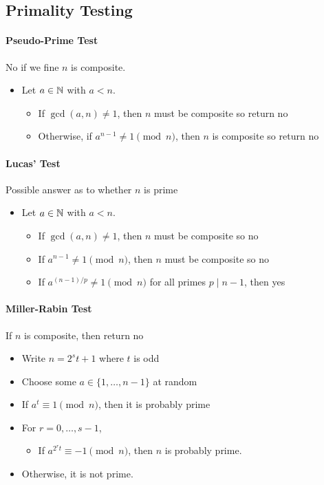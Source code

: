 \subsection{Primality Testing}
\paragraph{Pseudo-Prime Test}
No if we fine \(n\) is composite.
\begin{itemize}
    \item Let \(a \in \mathbb{N}\) with \(a < n\).
          \begin{itemize}
              \item If \(\gcd(a, n) \neq 1\), then \(n\) must be composite so return no
              \item Otherwise, if \(a^{n - 1} \neq 1 \pmod n\), then \(n\) is composite so return no
          \end{itemize}
\end{itemize}

\paragraph{Lucas' Test}
Possible answer as to whether \(n\) is prime
\begin{itemize}
    \item Let \(a \in \mathbb{N}\) with \(a < n\).
          \begin{itemize}
              \item If \(\gcd(a, n) \neq 1\), then \(n\) must be composite so no
              \item If \(a^{n - 1} \neq 1 \pmod n\), then \(n\) must be composite so no
              \item If \(a^{(n - 1) / p} \neq 1 \pmod n\) for all primes \(p \mid n - 1\), then yes
          \end{itemize}
\end{itemize}

\paragraph{Miller-Rabin Test}
If \(n\) is composite, then return no
\begin{itemize}
    \item Write \(n = 2^s t + 1\) where \(t\) is odd
    \item Choose some \(a \in \{1, \dots, n - 1\}\) at random
    \item If \(a^t \equiv 1 \pmod n\), then it is probably prime
    \item For \(r = 0, \dots, s - 1\),
          \begin{itemize}
              \item If \(a^{2^{r}t} \equiv -1 \pmod n\), then \(n\) is probably prime.
          \end{itemize}
    \item Otherwise, it is not prime.
\end{itemize}

